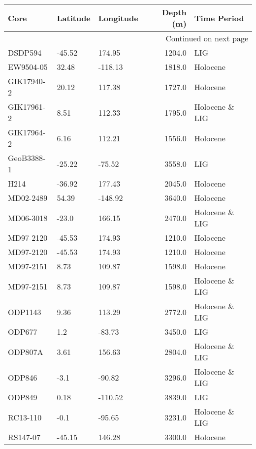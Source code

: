 \begin{longtable}{lllrl}

       Core & Latitude & Longitude &  Depth (m) &     Time Period \\

\endhead

\multicolumn{5}{r}{{Continued on next page}} \\

\endfoot


\endlastfoot
    DSDP594 &   -45.52 &    174.95 &     1204.0 &             LIG \\
  EW9504-05 &    32.48 &   -118.13 &     1818.0 &        Holocene \\
 GIK17940-2 &    20.12 &    117.38 &     1727.0 &        Holocene \\
 GIK17961-2 &     8.51 &    112.33 &     1795.0 &  Holocene \& LIG \\
 GIK17964-2 &     6.16 &    112.21 &     1556.0 &        Holocene \\
 GeoB3388-1 &   -25.22 &    -75.52 &     3558.0 &             LIG \\
       H214 &   -36.92 &    177.43 &     2045.0 &        Holocene \\
  MD02-2489 &    54.39 &   -148.92 &     3640.0 &        Holocene \\
  MD06-3018 &    -23.0 &    166.15 &     2470.0 &  Holocene \& LIG \\
  MD97-2120 &   -45.53 &    174.93 &     1210.0 &        Holocene \\
  MD97-2120 &   -45.53 &    174.93 &     1210.0 &        Holocene \\
  MD97-2151 &     8.73 &    109.87 &     1598.0 &        Holocene \\
  MD97-2151 &     8.73 &    109.87 &     1598.0 &  Holocene \& LIG \\
    ODP1143 &     9.36 &    113.29 &     2772.0 &  Holocene \& LIG \\
     ODP677 &      1.2 &    -83.73 &     3450.0 &             LIG \\
    ODP807A &     3.61 &    156.63 &     2804.0 &  Holocene \& LIG \\
     ODP846 &     -3.1 &    -90.82 &     3296.0 &  Holocene \& LIG \\
     ODP849 &     0.18 &   -110.52 &     3839.0 &             LIG \\
   RC13-110 &     -0.1 &    -95.65 &     3231.0 &  Holocene \& LIG \\
   RS147-07 &   -45.15 &    146.28 &     3300.0 &        Holocene \\

\end{longtable}

